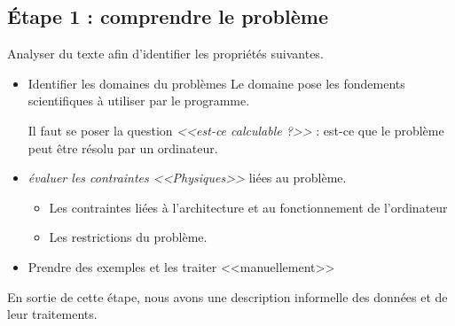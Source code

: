 		\subsection{\'Etape 1 : comprendre le problème}
			Analyser du texte afin d'identifier les propriétés suivantes.
			\begin{itemize}
				\item Identifier les domaines du problèmes
			Le domaine pose les fondements scientifiques à utiliser par le programme. 

						Il faut se poser la question \textit{<<est-ce calculable ?>>} : est-ce que le problème peut être résolu par un ordinateur.

			\item \textit{évaluer les contraintes <<Physiques>>} liées au problème. 
				\begin{itemize}
					\item Les contraintes liées à l'architecture et au fonctionnement de l'ordinateur
					\item Les restrictions du problème.
				\end{itemize}

			\item Prendre des exemples et les traiter <<manuellement>>
			\end{itemize}	

			En sortie de cette étape, nous avons une description informelle des données et de leur traitements.

